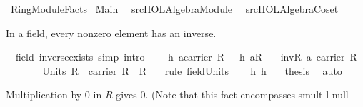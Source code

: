 %
\begin{isabellebody}%
\def\isabellecontext{RingModuleFacts}%
%
\isamarkuptrue%
%
\isadelimtheory
%
\endisadelimtheory
%
\isatagtheory
{}\isamarkupfalse%
\ RingModuleFacts\isanewline
{}\ Main\isanewline
\ \ {\isachardoublequoteopen}{\isachartilde}{\isachartilde}{\isacharslash}src{\isacharslash}HOL{\isacharslash}Algebra{\isacharslash}Module{\isachardoublequoteclose}\isanewline
\ \ {\isachardoublequoteopen}{\isachartilde}{\isachartilde}{\isacharslash}src{\isacharslash}HOL{\isacharslash}Algebra{\isacharslash}Coset{\isachardoublequoteclose}\isanewline
\ \ \isanewline
{}%
\endisatagtheory
{\isafoldtheory}%
%
\isadelimtheory
%
\endisadelimtheory
%
\isamarkuptrue%
%
\begin{isamarkuptext}%
In a field, every nonzero element has an inverse.%
\end{isamarkuptext}%
\isamarkuptrue%
\isamarkupfalse%
\ {\isacharparenleft}\ field{\isacharparenright}\ inverse{\isacharunderscore}exists\ {\isacharbrackleft}simp{\isacharcomma}\ intro{\isacharbrackright}{\isacharcolon}\ \isanewline
\ \ \ h{}{\isacharcolon}\ {\isachardoublequoteopen}a{\isasymin}carrier\ R{\isachardoublequoteclose}\ \ \ h{}{\isacharcolon}\ {\isachardoublequoteopen}a{\isasymnoteq}{\isasymzero}\isactrlbsub R\isactrlesub {\isachardoublequoteclose}\isanewline
\ \ \ {\isachardoublequoteopen}inv\isactrlbsub R\isactrlesub \ a{\isasymin}\ carrier\ R{\isachardoublequoteclose}\isanewline
%
\isadelimproof
%
\endisadelimproof
%
\isatagproof
{}\isamarkupfalse%
\ {\isacharminus}\ \isanewline
\ \ \isamarkupfalse%
\ {}{\isacharcolon}\ {\isachardoublequoteopen}Units\ R\ {\isacharequal}\ carrier\ R\ {\isacharminus}\ {\isacharbraceleft}{\isasymzero}\isactrlbsub R\isactrlesub {\isacharbraceright}\ {\isachardoublequoteclose}\ \isamarkupfalse%
\ {\isacharparenleft}rule\ field{\isacharunderscore}Units{\isacharparenright}\isanewline
\ \ \isamarkupfalse%
\ h{}\ h{}\ {}\ \isamarkupfalse%
\ {\isacharquery}thesis\ \isamarkupfalse%
\ auto\isanewline
{}\isamarkupfalse%
%
\endisatagproof
{\isafoldproof}%
%
\isadelimproof
%
\endisadelimproof
%
\begin{isamarkuptext}%
Multiplication by 0 in $R$ gives 0. (Note that this fact encompasses smult-l-null 

\end{isamarkuptext}
\end{isabellebody}
